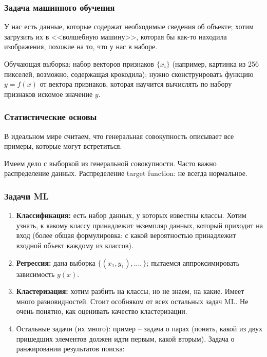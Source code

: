 \documentclass[main.tex]{subfiles}
\begin{document}
\subsubsection{Задача машинного обучения}

У нас есть данные, которые содержат необходимые сведения об объекте; хотим загрузить их в <<волшебную машину>>, которая бы как-то находила изображения, похожие на то, что у нас в наборе.

Обучающая выборка: набор векторов признаков $ \{x_i\} $ (например, картинка из 256 пикселей, возможно, содержащая крокодила); нужно сконструировать функцию $ y=f(x) $ от вектора признаков, которая научится вычислять по набору признаков искомое значение $y$.

\subsubsection{Статистические основы}

В идеальном мире считаем, что генеральная совокупность описывает все примеры, которые могут встретиться.

Имеем дело с выборкой из генеральной совокупности.
Часто важно распределение данных.
Распределение target function: не всегда нормальное.

\subsubsection{Задачи ML}

\begin{enumerate}[noitemsep]
	\item \textbf{Классификация:} есть набор данных, у которых известны классы.
	Хотим узнать, к какому классу принадлежит экземпляр данных, который приходит на вход (более общая формулировка: с какой вероятностью принадлежит входной объект каждому из классов).
	\item \textbf{Регрессия:} дана выборка $ \{ (x_1, y_1), ..., \} $; пытаемся аппроксимировать зависимость $ y(x) $.
	\item \textbf{Кластеризация:} хотим разбить на классы, но не знаем, на какие.
	Имеет много разновидностей.
	Стоит особняком от всех остальных задач ML.
	Не очень понятно, как оценивать качество кластеризации.
	\item Остальные задачи (их много): пример -- задача о парах (понять, какой из двух пришедших элементов должен идти первым, какой вторым).
	Задача о ранжировании результатов поиска: 
\end{enumerate}
\end{document}
